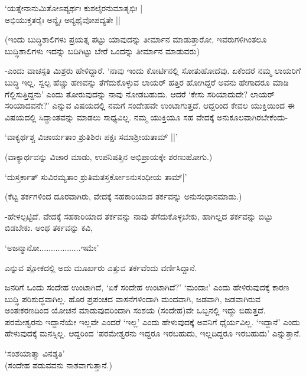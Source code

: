\begin{shloka}
`ಯತ್ನೇನಾನುಮಿತೋಽಪ್ಯರ್ಥಃ ಕುಶಲೈರನುಮಾತೃಭಿಃ |\\
ಅಭಿಯುಕ್ತತರೈಃ ಅನ್ಯೈಃ ಅನ್ಯಥೈವೋಪದ್ಯತೇ ||
\end{shloka}

(ಇಂದು ಬುದ್ಧಿಶಾಲಿಗಳು ಪ್ರಯತ್ನ ಪಟ್ಟು ಯಾವುದನ್ನು ತೀರ್ಮಾನ ಮಾಡುತ್ತಾರೋ, ಇವರುಗಳಿಗಿಂತಲೂ ಬುದ್ಧಿಶಾಲಿಗಳು ಇದನ್ನು ಬದಿಗಿಟ್ಟು ಬೇರೆ ಒಂದನ್ನು ತೀರ್ಮಾನ ಮಾಡುವರು)

-ಎಂದು ವಾಚಸ್ಪತಿ ಮಿಶ್ರರು ಹೇಳಿದ್ದಾರೆ. `ನಾವು ಇಂದು ಕೋರ್ಟಿನಲ್ಲಿ ಸೋತುಹೋದೆವು. ಏಕೆಂದರೆ ನಮ್ಮ ಲಾಯರಿಗೆ ಬುದ್ಧಿ ಇಲ್ಲ. ಸ್ವಲ್ಪ ಹೆಚ್ಚು ಹಣವನ್ನು ತೆಗೆದುಕೊಳ್ಳುವ ಲಾಯರ್ ಹತ್ತಿರ ಹೋಗಿದ್ದರೆ ಅವನು ಹೇಗಾದರೂ ಮಾಡಿ ಗೆಲ್ಲಿಸುತ್ತಿದ್ದನು' ಎಂದು ತೋರುವುದನ್ನು ನಾವು ನೋಡಬಹುದು. ಆದರೆ `ಕೇಸು ಸರಿಯಾದುದೇ? ಲಾಯರ್ ಸರಿಯಾದವನೇ?' ಎನ್ನುವ ವಿಷಯದಲ್ಲಿ ನಮಗೆ ಸಂದೇಹವೇ ಉಂಟಾಗುತ್ತದೆ. ಆದ್ದರಿಂದ ಕೇವಲ ಯುಕ್ತಿಯಿಂದ ಈ ವಿಷಯದಲ್ಲಿ ಸಿದ್ಧಾಂತವನ್ನು ಮಾಡಲು ಸಾಧ್ಯವಿಲ್ಲ. ನಮ್ಮ ಯುಕ್ತಿಯೂ ಸಹ ವೇದಕ್ಕೆ ಅನುಕೂಲವಾಗಿರಬೇಕೆಂದು-

\begin{shloka}
`ವಾಕ್ಯರ್ಥಶ್ಚ ವಿಚಾರ್ಯತಾಂ ಶ್ರುತಿಶಿರಃ ಪಕ್ಷಃ ಸಮಾಶ್ರೀಯತಾಮ್ ||'
\end{shloka}

(ವಾಕ್ಯಾರ್ಥವನ್ನು ವಿಚಾರ ಮಾಡು, ಉಪನಿಷತ್ತಿನ ಅಭಿಪ್ರಾಯಕ್ಕೇ ಶರಣುಹೋಗು.)

\begin{shloka}
`ದುಸ್ತರ್ಕಾತ್ ಸುವಿರಮ್ಯತಾಂ ಶ್ರುತಿಮತಸ್ತರ್ಕೋಽನುಸಂಧೀಯ ತಾಮ್|'
\end{shloka}

(ಕೆಟ್ಟ ತರ್ಕಗಳಿಂದ ದೂರವಾಗಿರು, ವೇದಕ್ಕೆ ಸಹಕಾರಿಯಾದ ತರ್ಕವನ್ನು ಅನುಸಂಧಾನಮಾಡು.)

-ಹೇಳಲ್ಪಟ್ಟಿದೆ. ವೇದಕ್ಕೆ ಸಹಕಾರಿಯಾದ ತರ್ಕವನ್ನು ನಾವು ತೆಗೆದುಕೊಳ್ಳಬೇಕು, ಹಾಗಿಲ್ಲದ ತರ್ಕವನ್ನು ಬಿಟ್ಟು ಬಿಡಬೇಕು. ಅಂಥ ತರ್ಕವನ್ನು ಕವಿ,

\begin{shloka}
`ಅಜನ್ಮಾನೋ..................ಇಮೇ'
\end{shloka}

ಎನ್ನುವ ಶ್ಲೋಕದಲ್ಲಿ ಅದು ಮೂರ್ಖರು ಎತ್ತುವ ತರ್ಕವೆಂದು ವರ್ಣಿಸಿದ್ದಾನೆ.

ಜನರಿಗೆ ಒಂದು ಸಂದೇಹ ಉಂಟಾಗಿದೆ, `ಏಕೆ ಸಂದೇಹ ಉಂಟಾಗಿದೆ?' `ಮಂದಾಃ' ಎಂದು ಹೇಳಿರುವುದಕ್ಕೆ ಕಾರಣ ಬುದ್ಧಿ ಪರಿಶುದ್ಧವಾಗಿಲ್ಲ. ಹೊರ ಪ್ರಪಂಚದ ವಾಸನೆಗಳಿಂದಾಗಿ ಮಂದವಾಗಿ, ಜಡವಾಗಿ, ಜಡವಾಗಿರುವ ಅಂತಃಕರಣದಿಂದ ಯೋಚನೆ ಮಾಡುವುದರಿಂದಾಗಿ ಸಂಶಯ (ಸಂದೇಹ)ವೇ ಒಬ್ಬನಲ್ಲಿ ಇದ್ದು ಬಿಡುತ್ತದೆ. ಪರಮೇಶ್ವರನು ಇದ್ದಾನೆಯೇ ಇಲ್ಲವೇ ಎಂದರೆ `ಇಲ್ಲ' ಎಂದು ಹೇಳುವುದಕ್ಕೆ ಅವನಿಗೆ ಧೈರ್ಯವಿಲ್ಲ. `ಇದ್ದಾನೆ' ಎಂದು ಹೇಳುವುದಕ್ಕೆ ಮನಸ್ಸಿಲ್ಲ. ಆದ್ದರಿಂದ `ಪರಮೇಶ್ವರನು ಇದ್ದರೂ ಇರಬಹುದು, ಇಲ್ಲದಿದ್ದರೂ ಇರಬಹುದು' ಎನ್ನುತ್ತಾನೆ.

\begin{shloka}
`ಸಂಶಯಾತ್ಮಾ ವಿನಶ್ಶತಿ'\\
(ಸಂದೇಹ ಪಡುವವನು ನಾಶವಾಗುತ್ತಾನೆ.)
\end{shloka}

